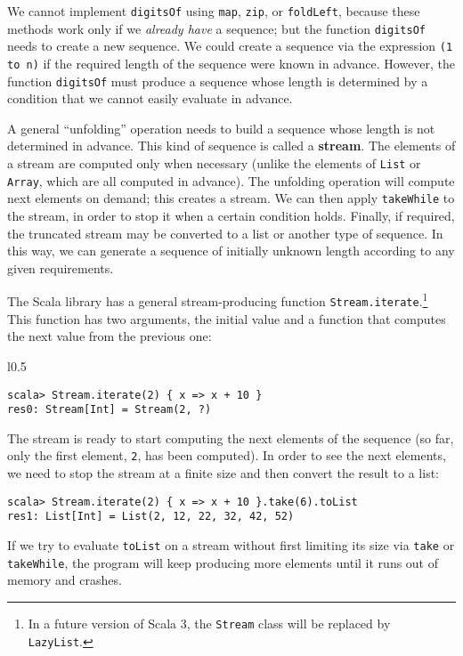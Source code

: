 \noindent We cannot implement \lstinline!digitsOf! using \lstinline!map!,
\lstinline!zip!, or \lstinline!foldLeft!, because these methods
work only if we \emph{already have} a sequence; but the function \lstinline!digitsOf!
needs to create a new sequence. We could create a sequence via the
expression \lstinline!(1 to n)! if the required length of the sequence
were known in advance. However, the function \lstinline!digitsOf!
must produce a sequence whose length is determined by a condition
that we cannot easily evaluate in advance.

A general \textsf{``}unfolding\textsf{''} operation needs to build a sequence whose
length is not determined in advance. This kind of sequence is called
a \textbf{stream}. The elements of a stream are computed
only when necessary (unlike the elements of \lstinline!List! or \lstinline!Array!,
which are all computed in advance). The unfolding operation will compute
next elements on demand; this creates a stream. We can then apply
\lstinline!takeWhile! to the stream, in order to stop it when a certain
condition holds. Finally, if required, the truncated stream may be
converted to a list or another type of sequence. In this way, we can
generate a sequence of initially unknown length according to any given
requirements.

The Scala library has a general stream-producing function \lstinline!Stream.iterate!.\footnote{In a future version of Scala 3, the \lstinline!Stream! class will
be replaced by \lstinline!LazyList!.} This function has two arguments, the initial value and a function
that computes the next value from the previous one:

\begin{wrapfigure}{l}{0.5\columnwidth}%
\vspace{-0.7\baselineskip}
\begin{lstlisting}
scala> Stream.iterate(2) { x => x + 10 }
res0: Stream[Int] = Stream(2, ?)
\end{lstlisting}

\vspace{-1\baselineskip}
\end{wrapfigure}%

\noindent The stream is ready to start computing the next elements
of the sequence (so far, only the first element, \lstinline!2!, has
been computed). In order to see the next elements, we need to stop
the stream at a finite size and then convert the result to a list:
\begin{lstlisting}
scala> Stream.iterate(2) { x => x + 10 }.take(6).toList
res1: List[Int] = List(2, 12, 22, 32, 42, 52)
\end{lstlisting}
If we try to evaluate \lstinline!toList! on a stream without first
limiting its size via \lstinline!take! or \lstinline!takeWhile!,
the program will keep producing more elements until it runs out of
memory and crashes.

